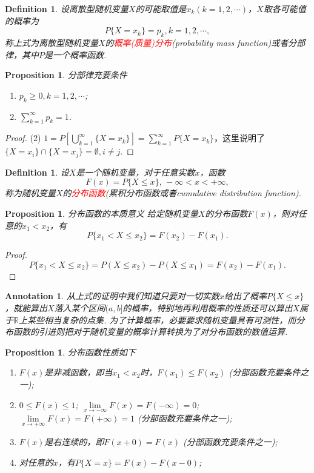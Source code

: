 \documentclass{article}
\newtheorem{proposition}[theorem]{Proposition}
\newtheorem{definition}[theorem]{Definition}
\newtheorem{annotation}[theorem]{Annotation}
\newcommand{\redt}[1]{\textcolor{red}{#1}}
\begin{document}
\begin{definition}
\rm 设离散型随机变量$X$的可能取值是$x_k(k=1,2,\cdots)$，$X$取各可能值的概率为
$$
P\{X=x_k\} = p_k, k=1,2,\cdots,
$$
称上式为离散型随机变量$X$的\redt{概率(质量)分布}(probability mass function)或者分部律，其中$P$是一个概率函数.
\end{definition}

\begin{proposition}
\rm 分部律充要条件
\begin{enumerate}
	\item $p_k \geq 0,k=1,2,\cdots$;
	\item $\sum\limits_{k=1}^\infty p_k = 1$.
\end{enumerate}
\end{proposition}

\begin{proof}
{\color{red}(2)} $1 = P[\bigcup\limits_{k=1}^{\infty}\{X= x_k\}] = \sum\limits_{k=1}^{\infty} P\{X=x_k\}$，这里说明了$\{X=x_i\} \cap \{X = x_j\} = \emptyset, i \neq j$.
\end{proof}

\begin{definition}
\rm 设$X$是一个随机变量，对于任意实数$x$，函数
$$
F(x) = P\{X \leq x\},\,-\infty < x < +\infty,
$$
称为随机变量$X$的\redt{分布函数}(累积分布函数或者cumulative distribution function). 
\end{definition}

\begin{proposition}
\rm {\color{red} 分布函数的本质意义} 给定随机变量$X$的分布函数$F(x)$，则对任意的$x_1 < x_2$，有
$$
P\{x_1 < X \leq x_2\} = F(x_2) - F(x_1).
$$
\end{proposition}

\begin{proof}
$$
P\{x_1 < X \leq x_2\} = P(X \leq x_2) - P(X \leq x_1) = F(x_2)-F(x_1).
$$
\end{proof}

\begin{annotation}
\rm {\color{blue}从上式的证明中我们知道只要对一切实数$x$给出了概率$P\{X \leq x\}$，就能算出$X$落入某个区间$(a,b]$的概率，特别地再利用概率的性质还可以算出$X$属于$\mathbb{R}$上某些相当复杂的点集}. 为了计算概率，必要要求随机变量具有可测性，而分布函数的引进则把对于随机变量的概率计算转换为了对分布函数的数值运算. 
\end{annotation}

\begin{proposition}
\rm 分布函数性质如下
\begin{enumerate}
	\item $F(x)$是非减函数，即当$x_1 < x_2$时，$F(x_1) \leq F(x_2)$ ({\color{red}分部函数充要条件之一});
	\item $0 \leq F(x) \leq 1$; $\lim\limits_{x \rightarrow -\infty}F(x) =F(-\infty) = 0$; $\lim\limits_{x \rightarrow +\infty}F(x) =F(+\infty)= 1$ ({\color{red}分部函数充要条件之一});
	\item $F(x)$是右连续的，即$F(x+0) = F(x)$ ({\color{red}分部函数充要条件之一}); 
	\item 对任意的$x$，有$P\{X = x\} = F(x) - F(x-0)$;  
\end{enumerate}
\end{proposition}
\end{document}
